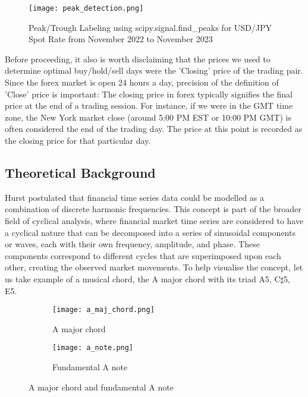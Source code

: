 \documentclass{article}
\begin{document}
\begin{figure}[h]
  \centering
  \texttt{[image: peak\_detection.png]}
  \caption{Peak/Trough Labeling using scipy.signal.find\_peaks for USD/JPY Spot Rate from November 2022 to November 2023}
\end{figure}

\noindent Before proceeding, it also is worth disclaiming that the prices we used to determine optimal buy/hold/sell days were the 'Closing' price of the trading pair. Since the forex market is open 24 hours a day, precision of the definition of 'Close' price is important: The closing price in forex typically signifies the final price at the end of a trading session. For instance, if we were in the GMT time zone, the New York market close (around 5:00 PM EST or 10:00 PM GMT) is often considered the end of the trading day. The price at this point is recorded as the closing price for that particular day.

\subsection{Theoretical Background}
Hurst postulated that financial time series data could be modelled as a combination of discrete harmonic frequencies. This concept is part of the broader field of cyclical analysis, where financial market time series are considered to have a cyclical nature that can be decomposed into a series of sinusoidal components or waves, each with their own frequency, amplitude, and phase. These components correspond to different cycles that are superimposed upon each other, creating the observed market movements.
\newline
\newline
To help visualise the concept, let us take example of a musical chord, the A major chord with its triad A5, C\(\sharp\)5, E5.
\newline

\begin{figure}[h]
  \centering
  \begin{subfigure}{0.4\textwidth}
    \centering
    \texttt{[image: a\_maj\_chord.png]}
    \caption{A major chord}
  \end{subfigure}
  \hspace{0.1\textwidth} %
  \begin{subfigure}{0.4\textwidth}
    \centering
    \texttt{[image: a\_note.png]}
    \caption{Fundamental A note}
  \end{subfigure}
  \caption{A major chord and fundamental A note}
  \label{fig:a_major_chord_note}
\end{figure}
\end{document}
